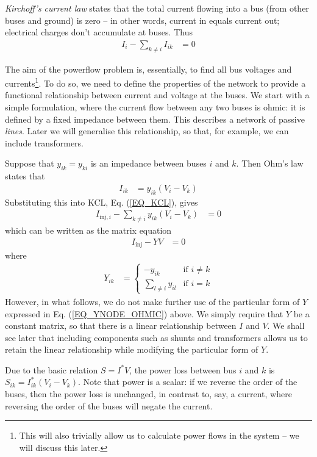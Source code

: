\documentclass[10pt]{article}
\begin{document}
\emph{Kirchoff's current law} states that the total current flowing into a bus (from other buses and ground) is zero -- in other words, current in equals current out; electrical charges don't accumulate at buses. Thus
\begin{align}
	I_{i} - \sum_{k \ne i}{I_{ik}} &= 0
	\label{EQ_KCL}
\end{align}

The aim of the powerflow problem is, essentially, to find all bus voltages and currents\footnote{This will also trivially allow us to calculate power flows in the system -- we will discuss this later.}. To do so, we need to define the properties of the network to provide a functional relationship between current and voltage at the buses. We start with a simple formulation, where the current flow between any two buses is ohmic: it is defined by a fixed impedance between them. This describes a network of passive \emph{lines}. Later we will generalise this relationship, so that, for example, we can include transformers.

Suppose that $y_{ik} = y_{ki}$ is an impedance between buses $i$ and $k$. Then Ohm's law states that
\begin{align}
	I_{ik} &= y_{ik}(V_i - V_k)
\end{align}
Substituting this into KCL, Eq. (\ref{EQ_KCL}), gives
\begin{align}
	I_{\text{inj},i} - \sum_{k \ne i}{y_{ik}(V_i - V_k)} &= 0
	\label{EQ_PF_1}
\end{align}
which can be written as the matrix equation
\begin{align}
	I_\text{inj} - YV &= 0
\end{align}
where
\begin{align}
	Y_{ik} &=
		\begin{cases}
			-y_{ik}&\text{if $i \ne k$} \\
			\sum_{l \ne i} y_{il}& \text{if $i = k$}
		\end{cases}
	\label{EQ_YNODE_OHMIC}
\end{align}
However, in what follows, we do not make further use of the particular form of $Y$ expressed in Eq. (\ref{EQ_YNODE_OHMIC}) above. We simply require that $Y$ be a constant matrix, so that there is a linear relationship between $I$ and $V$. We shall see later that including components such as shunts and transformers allows us to retain the linear relationship while modifying the particular form of $Y$.

Due to the basic relation $S = I^*V$, the power loss between bus $i$ and $k$ is $S_{ik} = I_{ik}^*(V_i - V_k)$. Note that power is a scalar: if we reverse the order of the buses, then the power loss is unchanged, in contrast to, say, a current, where reversing the order of the buses will negate the current.
\end{document}
